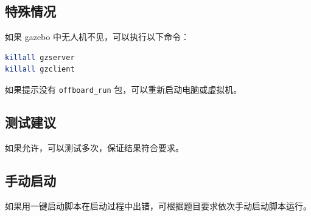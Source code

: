 \documentclass[12pt]{article}
\begin{document}
\subsection{特殊情况}
如果 gazebo 中无人机不见，可以执行以下命令：
\begin{lstlisting}[language=bash]
killall gzserver
killall gzclient
\end{lstlisting}

如果提示没有 \texttt{offboard\_run} 包，可以重新启动电脑或虚拟机。

\subsection{测试建议}
如果允许，可以测试多次，保证结果符合要求。

\subsection{手动启动}
如果用一键启动脚本在启动过程中出错，可根据题目要求依次手动启动脚本运行。
\end{document}
